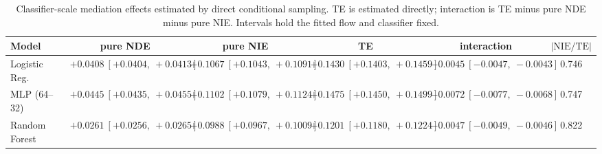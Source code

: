 \begin{table}[htbp]
  \centering
  \caption{Classifier-scale mediation effects estimated by direct conditional sampling. TE is estimated directly; interaction is TE minus pure NDE minus pure NIE. Intervals hold the fitted flow and classifier fixed.}
  \label{tab:german_synth_m05_gap_overall}
  \begin{tabular}{lccccc}
    \toprule
    Model & pure NDE & pure NIE & TE & interaction & $|\mathrm{NIE}/\mathrm{TE}|$ \\
    \midrule
    Logistic Reg. & $+0.0408\ [+0.0404,\ +0.0413]$ & $+0.1067\ [+0.1043,\ +0.1091]$ & $+0.1430\ [+0.1403,\ +0.1459]$ & $-0.0045\ [-0.0047,\ -0.0043]$ & 0.746 \\
    MLP (64--32) & $+0.0445\ [+0.0435,\ +0.0455]$ & $+0.1102\ [+0.1079,\ +0.1124]$ & $+0.1475\ [+0.1450,\ +0.1499]$ & $-0.0072\ [-0.0077,\ -0.0068]$ & 0.747 \\
    Random Forest & $+0.0261\ [+0.0256,\ +0.0265]$ & $+0.0988\ [+0.0967,\ +0.1009]$ & $+0.1201\ [+0.1180,\ +0.1224]$ & $-0.0047\ [-0.0049,\ -0.0046]$ & 0.822 \\
    \bottomrule
  \end{tabular}
\end{table}